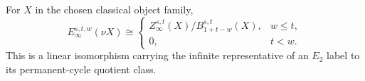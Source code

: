 \begin{proposition}
For $X$ in the chosen classical object family,
\[E_\infty^{s,t,w}(\nu X)\cong
\begin{cases}Z_\infty^{s,t}(X)/B_{1+t-w}^{s,t}(X),&w\le t,\\0,&t<w.\end{cases}\]
This is a linear isomorphism carrying the infinite representative of an $E_2$ label to its permanent-cycle quotient class.

\end{proposition}
